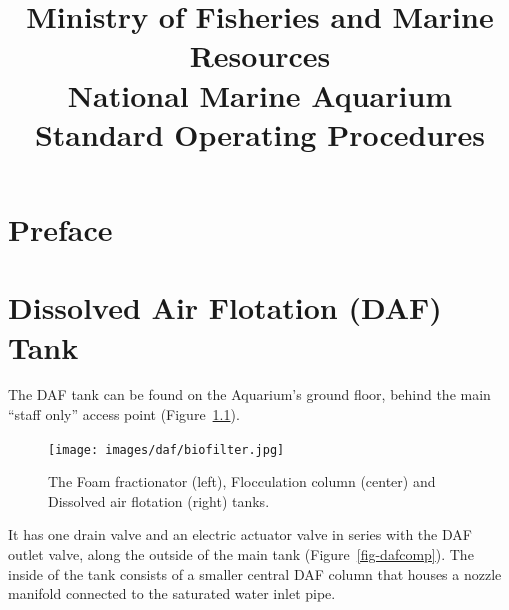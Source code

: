 \documentclass[
  12pt,
]{report}
\title{\vspace{0cm}
\LARGE\bfseries Ministry of Fisheries and Marine Resources\\
\vspace{0.8cm} \Large National Marine Aquarium\\
\vspace{2.5cm} \LARGE\bfseries Standard Operating Procedures}
\author{}
\date{}
\begin{document}
\maketitle
\ifdefined\Shaded\renewenvironment{Shaded}{\begin{tcolorbox}[boxrule=0pt, borderline west={3pt}{0pt}{shadecolor}, frame hidden, sharp corners, enhanced, interior hidden, breakable]}{\end{tcolorbox}}\fi

\listoffigures

\hypertarget{preface}{%
\chapter*{Preface}\label{preface}}

\newpage

\hypertarget{dissolved-air-flotation-daf-tank}{%
\chapter{Dissolved Air Flotation (DAF)
Tank}\label{dissolved-air-flotation-daf-tank}}

The DAF tank can be found on the Aquarium's ground floor, behind the
main ``staff only'' access point (Figure~\ref{fig-biofilter}).

\begin{figure}[H]

{\centering \texttt{[image: images/daf/biofilter.jpg]}

}

\caption{\label{fig-biofilter}The Foam fractionator (left), Flocculation
column (center) and Dissolved air flotation (right) tanks.}

\end{figure}

It has one drain valve and an electric actuator valve in series with the
DAF outlet valve, along the outside of the main tank
(Figure~\ref{fig-dafcomp}). The inside of the tank consists of a smaller
central DAF column that houses a nozzle manifold connected to the
saturated water inlet pipe.
\end{document}
